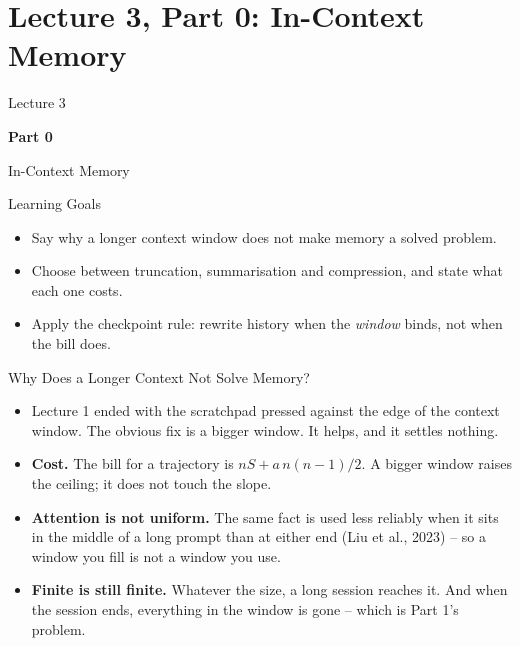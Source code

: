 \section{Lecture 3, Part 0: In-Context Memory}

\begin{frame}
\vfill
\centering
{\color{RLBlue}\large Lecture 3}

\vspace{0.3em}
{\color{RLBlue}\Large\bfseries Part 0}

\vspace{0.6em}
{\Large In-Context Memory}
\vfill
\end{frame}

\begin{frame}{Learning Goals}
\begin{itemize}
  \item Say why a longer context window does not make memory a solved problem.
  \pause
  \item Choose between truncation, summarisation and compression, and state what each one costs.
  \pause
  \item Apply the checkpoint rule: rewrite history when the \emph{window} binds, not when the bill does.
\end{itemize}
\end{frame}

\begin{frame}{Why Does a Longer Context Not Solve Memory?}
\begin{itemize}
  \item Lecture 1 ended with the scratchpad pressed against the edge of the context window. The obvious fix is a bigger window. It helps, and it settles nothing.
  \pause
  \item \textbf{Cost.} The bill for a trajectory is $nS + a\,n(n-1)/2$. A bigger window raises the ceiling; it does not touch the slope.
  \pause
  \item \textbf{Attention is not uniform.} The same fact is used less reliably when it sits in the middle of a long prompt than at either end (Liu et al., 2023) -- so a window you fill is not a window you use.
  \pause
  \item \textbf{Finite is still finite.} Whatever the size, a long session reaches it. And when the session ends, everything in the window is gone -- which is Part 1's problem.
\end{itemize}
\end{frame}

